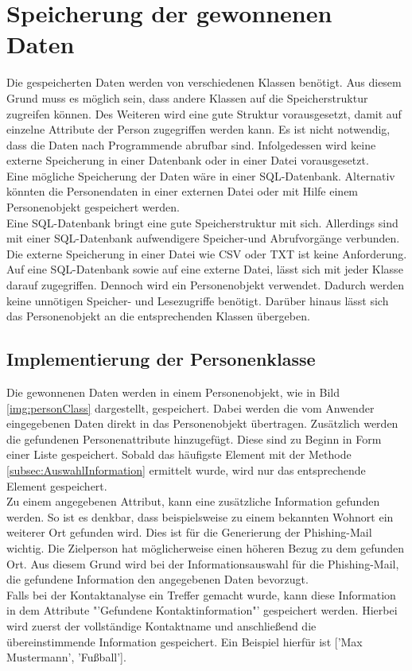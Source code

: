 \section{Speicherung der gewonnenen Daten}
Die gespeicherten Daten werden von verschiedenen Klassen benötigt. Aus diesem Grund muss es möglich sein, dass andere Klassen auf die Speicherstruktur zugreifen können. Des Weiteren wird eine gute Struktur vorausgesetzt, damit auf einzelne Attribute der Person zugegriffen werden kann. Es ist nicht notwendig, dass die Daten nach Programmende abrufbar sind. Infolgedessen wird keine externe Speicherung in einer Datenbank oder in einer Datei vorausgesetzt.\\
Eine mögliche Speicherung der Daten wäre in einer SQL-Datenbank. Alternativ könnten die Personendaten in einer externen Datei oder mit Hilfe einem Personenobjekt gespeichert werden.\\
Eine SQL-Datenbank bringt eine gute Speicherstruktur mit sich. Allerdings sind mit einer SQL-Datenbank aufwendigere Speicher-und Abrufvorgänge verbunden. Die externe Speicherung in einer Datei wie CSV oder TXT ist keine Anforderung. Auf eine SQL-Datenbank sowie auf eine externe Datei, lässt sich mit jeder Klasse darauf zugegriffen. Dennoch wird ein Personenobjekt verwendet. Dadurch werden keine unnötigen Speicher- und Lesezugriffe benötigt. Darüber hinaus lässt sich das Personenobjekt an die entsprechenden Klassen übergeben.
	\subsection{Implementierung der Personenklasse}
	Die gewonnenen Daten werden in einem Personenobjekt, wie in Bild \ref{img:personClass} dargestellt, gespeichert. Dabei werden die vom Anwender eingegebenen Daten direkt in das Personenobjekt übertragen. Zusätzlich werden die gefundenen Personenattribute hinzugefügt. Diese sind zu Beginn in Form einer Liste gespeichert. Sobald das häufigste Element mit der Methode \ref{subsec:AuswahlInformation} ermittelt wurde, wird nur das entsprechende Element gespeichert.\\
	Zu einem angegebenen Attribut, kann eine zusätzliche Information gefunden werden. So ist es denkbar, dass beispielsweise zu einem bekannten Wohnort ein weiterer Ort gefunden wird. Dies ist für die Generierung der Phishing-Mail wichtig. Die Zielperson hat möglicherweise einen höheren Bezug zu dem gefunden Ort. Aus diesem Grund wird bei der Informationsauswahl für die Phishing-Mail, die gefundene Information den angegebenen Daten bevorzugt.\\
	Falls bei der Kontaktanalyse ein Treffer gemacht wurde, kann diese Information in dem Attribute "'Gefundene Kontaktinformation"' gespeichert werden. Hierbei wird zuerst der vollständige Kontaktname und anschließend die übereinstimmende Information gespeichert. Ein Beispiel hierfür ist ['Max Mustermann', 'Fußball'].\\
	
